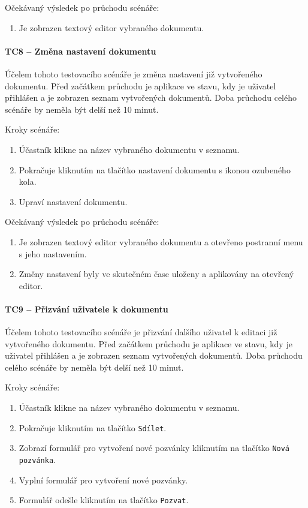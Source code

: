 Očekávaný výsledek po průchodu scénáře:
\begin{enumerate}
    \item Je zobrazen textový editor vybraného dokumentu.
\end{enumerate}

\paragraph{TC8 -- Změna nastavení dokumentu}

Účelem tohoto testovacího scénáře je změna nastavení již vytvořeného dokumentu.
Před začátkem průchodu je aplikace ve stavu, kdy je uživatel přihlášen a je zobrazen seznam vytvořených dokumentů.
Doba průchodu celého scénáře by neměla být delší než 10 minut.

Kroky scénáře:
\begin{enumerate}
    \item Účastník klikne na název vybraného dokumentu v seznamu.
    \item Pokračuje kliknutím na tlačítko nastavení dokumentu s ikonou ozubeného kola.
    \item Upraví nastavení dokumentu.
\end{enumerate}

Očekávaný výsledek po průchodu scénáře:
\begin{enumerate}
    \item Je zobrazen textový editor vybraného dokumentu a otevřeno postranní menu s jeho nastavením.
    \item Změny nastavení byly ve skutečném čase uloženy a aplikovány na otevřený editor.
\end{enumerate}

\paragraph{TC9 -- Přizvání uživatele k dokumentu}

Účelem tohoto testovacího scénáře je přizvání dalšího uživatel k editaci již vytvořeného dokumentu.
Před začátkem průchodu je aplikace ve stavu, kdy je uživatel přihlášen a je zobrazen seznam vytvořených dokumentů.
Doba průchodu celého scénáře by neměla být delší než 10 minut.

Kroky scénáře:
\begin{enumerate}
    \item Účastník klikne na název vybraného dokumentu v seznamu.
    \item Pokračuje kliknutím na tlačítko \texttt{Sdílet}.
    \item Zobrazí formulář pro vytvoření nové pozvánky kliknutím na tlačítko \texttt{Nová pozvánka}.
    \item Vyplní formulář pro vytvoření nové pozvánky.
    \item Formulář odešle kliknutím na tlačítko \texttt{Pozvat}.
\end{enumerate}

